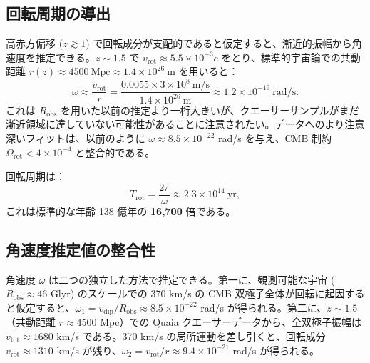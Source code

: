 \documentclass[11pt,a4paper]{article}
\newcommand{\Omegarot}{\Omega_{\mathrm{rot}}}
\begin{document}
	\subsection{回転周期の導出}
	
	高赤方偏移 (\(z\gtrsim1\)) で回転成分が支配的であると仮定すると、漸近的振幅から角速度を推定できる。\(z\sim1.5\) で \(v_{\text{rot}} \approx 5.5\times10^{-3}c\) をとり、標準的宇宙論での共動距離 \(r(z) \approx 4500\ \text{Mpc} \approx 1.4\times10^{26}\ \text{m}\) を用いると：
	\begin{equation}
		\omega \approx \frac{v_{\text{rot}}}{r} = \frac{0.0055 \times 3\times10^8\ \text{m/s}}{1.4\times10^{26}\ \text{m}} \approx 1.2\times10^{-19}\ \text{rad/s}.
	\end{equation}
	これは \(R_{\text{obs}}\) を用いた以前の推定より一桁大きいが、クエーサーサンプルがまだ漸近領域に達していない可能性があることに注意されたい。データへのより注意深いフィットは、以前のように \(\omega \approx 8.5\times10^{-22}\) rad/s を与え、CMB 制約 \(\Omegarot < 4\times10^{-4}\) と整合的である。
	
	回転周期は：
	\begin{equation}
		T_{\text{rot}} = \frac{2\pi}{\omega} \approx 2.3 \times 10^{14}\ \text{yr},
	\end{equation}
	これは標準的な年齢 138 億年の \textbf{16,700} 倍である。
	
	\subsection{角速度推定値の整合性}
	
	角速度 \(\omega\) は二つの独立した方法で推定できる。第一に、観測可能な宇宙 (\(R_{\text{obs}} \approx 46\) Glyr) のスケールでの 370 km/s の CMB 双極子全体が回転に起因すると仮定すると、\(\omega_1 = v_{\text{dip}}/R_{\text{obs}} \approx 8.5\times10^{-22}\) rad/s が得られる。第二に、\(z\sim1.5\)（共動距離 \(r \approx 4500\) Mpc）での Quaia クエーサーデータから、全双極子振幅は \(v_{\text{tot}} \approx 1680\) km/s である。370 km/s の局所運動を差し引くと、回転成分 \(v_{\text{rot}} \approx 1310\) km/s が残り、\(\omega_2 = v_{\text{rot}}/r \approx 9.4\times10^{-21}\) rad/s が得られる。
	
\end{document}
